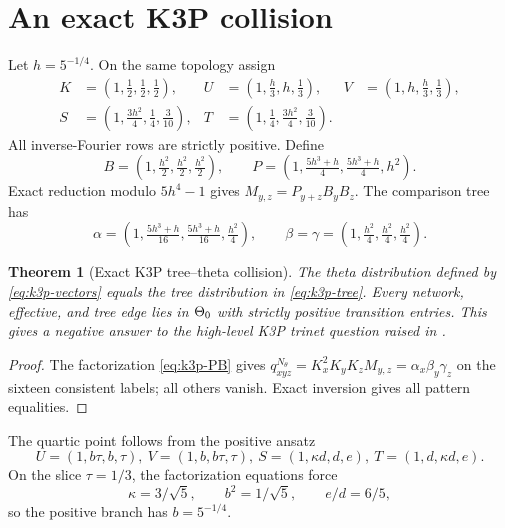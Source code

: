 \documentclass[11pt]{article}
\newtheorem{theorem}{Theorem}\newtheorem{proposition}[theorem]{Proposition}\newtheorem{lemma}[theorem]{Lemma}\newtheorem{corollary}[theorem]{Corollary}
\theoremstyle{remark}\newtheorem{remark}[theorem]{Remark}
\begin{document}
\section{An exact K3P collision}\label{sec:k3p}
Let $h=5^{-1/4}$. On the same topology assign
\begin{equation}\label{eq:k3p-vectors}
\begin{aligned}
K&=(1,\tfrac12,\tfrac12,\tfrac12),&U&=(1,\tfrac h3,h,\tfrac13),&V&=(1,h,\tfrac h3,\tfrac13),\\
S&=(1,\tfrac{3h^2}{4},\tfrac14,\tfrac3{10}),&T&=(1,\tfrac14,\tfrac{3h^2}{4},\tfrac3{10}).
\end{aligned}
\end{equation}
All inverse-Fourier rows are strictly positive. Define
\begin{equation}\label{eq:k3p-PB}B=(1,\tfrac{h^2}{2},\tfrac{h^2}{2},\tfrac{h^2}{2}),\qquad P=(1,\tfrac{5h^3+h}{4},\tfrac{5h^3+h}{4},h^2).\end{equation}
Exact reduction modulo $5h^4-1$ gives $M_{y,z}=P_{y+z}B_yB_z$. The comparison tree has
\begin{equation}\label{eq:k3p-tree}
\alpha=(1,\tfrac{5h^3+h}{16},\tfrac{5h^3+h}{16},\tfrac{h^2}{4}),\qquad \beta=\gamma=(1,\tfrac{h^2}{4},\tfrac{h^2}{4},\tfrac{h^2}{4}).
\end{equation}
\begin{theorem}[Exact K3P tree--theta collision]\label{thm:k3p}
The theta distribution defined by \eqref{eq:k3p-vectors} equals the tree distribution in \eqref{eq:k3p-tree}. Every network, effective, and tree edge lies in $\Theta_0$ with strictly positive transition entries. This gives a negative answer to the high-level K3P trinet question raised in \cite{BritsHoltgrefeVanIerselMartin2026}.
\end{theorem}
\begin{proof}
The factorization \eqref{eq:k3p-PB} gives $q^{N_\theta}_{xyz}=K_x^2K_yK_zM_{y,z}=\alpha_x\beta_y\gamma_z$ on the sixteen consistent labels; all others vanish. Exact inversion gives all pattern equalities.
\end{proof}
The quartic point follows from the positive ansatz
\[
U=(1,b\tau,b,\tau),\ V=(1,b,b\tau,\tau),\ S=(1,\kappa d,d,e),\ T=(1,d,\kappa d,e).
\]
On the slice $\tau=1/3$, the factorization equations force
\[
\kappa=3/\sqrt5,\qquad b^2=1/\sqrt5,\qquad e/d=6/5,
\]
so the positive branch has $b=5^{-1/4}$.
\end{document}
